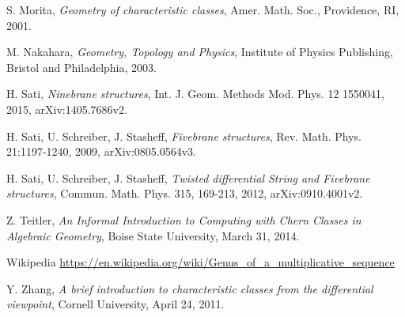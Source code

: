 \documentclass{amsart}
\theoremstyle{plain}
\numberwithin{equation}{section}
\begin{document}
\begin{thebibliography}{99}
S. Morita, {\it Geometry of characteristic classes},
Amer. Math. Soc., Providence, RI, 2001. 

 M. Nakahara, \emph{Geometry, Topology and Physics}, Institute of Physics Publishing, Bristol and Philadelphia, 2003.

 H. Sati, \emph{Ninebrane structures}, Int. J. Geom. Methods Mod. Phys. 12 1550041, 2015, arXiv:1405.7686v2.

 H. Sati, U. Schreiber, J. Stasheff, \emph{Fivebrane structures}, Rev. Math. Phys. 21:1197-1240, 2009, arXiv:0805.0564v3.

 H. Sati, U. Schreiber, J. Stasheff, \emph{Twisted differential String and Fivebrane structures}, Commun. Math. Phys. 315, 169-213, 2012, arXiv:0910.4001v2.

 Z. Teitler,
\emph{An Informal Introduction to Computing with Chern Classes in Algebraic Geometry},
Boise State University, March 31, 2014.

Wikipedia \url{ https://en.wikipedia.org/wiki/Genus_of_a_multiplicative_sequence}

 Y. Zhang, \textit{A brief introduction to characteristic classes from the differential viewpoint}, Cornell University, April 24, 2011.


\end{thebibliography}
\end{document}
